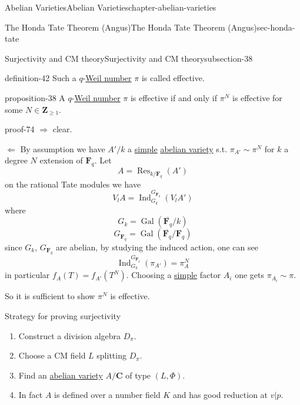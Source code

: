 \documentclass[oneside,10pt,]{book}
\numberwithin{equation}{section}
\newcommand{\ZZ}{\mathbf{Z}}
\newcommand{\CC}{\mathbf{C}}
\newcommand{\FF}{\mathbf{F}}
\newcommand{\Gal}[2]{\operatorname{Gal}(#1/#2)}
\DeclareMathOperator{\Ind}{Ind}
\DeclareMathOperator{\Res}{Res}
\begin{document}
\begin{chapterptx}{Abelian Varieties}{}{Abelian Varieties}{}{}{chapter-abelian-varieties}
\begin{sectionptx}{The Honda Tate Theorem (Angus)}{}{The Honda Tate Theorem (Angus)}{}{}{sec-honda-tate}
\begin{subsectionptx}{Surjectivity and CM theory}{}{Surjectivity and CM theory}{}{}{subsection-38}
\begin{definition}{}{definition-42}
\hypertarget{p-432}{}%
Such a \(q\)-\hyperref[sec-honda-tate]{Weil number} \(\pi\) is called effective.%
\end{definition}
\begin{proposition}{}{}{proposition-38}%
\hypertarget{p-433}{}%
A \(q\)-\hyperref[sec-honda-tate]{Weil number} \(\pi\) is effective if and only if \(\pi^N\) is effective for some \(N\in \ZZ_{\ge 1}\).%
\end{proposition}
\begin{proofptx}{}{proof-74}
\hypertarget{p-434}{}%
\(\Rightarrow\) clear.%
\par
\hypertarget{p-435}{}%
\(\Leftarrow\) By assumption we have \(A'/k\) a \hyperref[def-simple-av]{simple} \hyperref[def-buntes-abvar]{abelian variety} s.t. \(\pi_{A'} \sim  \pi^N\) for \(k\) a degree \(N\) extension of \(\FF_q\). Let%
\begin{equation*}
A = \Res_{k/\FF_q}(A')
\end{equation*}
on the rational Tate modules we have%
\begin{equation*}
V_l A = \Ind_{G_k}^{G_{\FF_q}} (V_lA')
\end{equation*}
where%
\begin{equation*}
G_k = \Gal{\overline{\FF_q}}{k}
\end{equation*}
%
\begin{equation*}
G_{\FF_q} = \Gal{\overline{\FF_q}}{\FF_q}
\end{equation*}
since \(G_k\), \(G_{\FF_q}\) are abelian, by studying the induced action, one can see%
\begin{equation*}
\Ind_{G_k}^{G_{\FF_q}} (\pi_{A'}) = \pi_A^N
\end{equation*}
in particular \(f_A(T) = f_{A'}(T^N)\). Choosing a \hyperref[def-simple-av]{simple} factor \(A_i\) one gets \(\pi_{A_i} \sim \pi\).%
\end{proofptx}
\hypertarget{p-436}{}%
So it is sufficient to show \(\pi^N\) is effective.%
\par
\hypertarget{p-437}{}%
Strategy for proving surjectivity\leavevmode%
\begin{enumerate}
\item\hypertarget{li-87}{}Construct a division algebra \(D_\pi\).%
\item\hypertarget{li-88}{}Choose a CM field \(L\) splitting \(D_\pi\).%
\item\hypertarget{li-89}{}Find an \hyperref[def-buntes-abvar]{abelian variety} \(A/\CC\) of type \((L, \Phi)\).%
\item\hypertarget{li-90}{}In fact \(A\) is defined over  a number field \(K\) and has good reduction at \(v|p\).%

\end{enumerate}
\end{subsectionptx}
\end{sectionptx}
\end{chapterptx}
\end{document}
